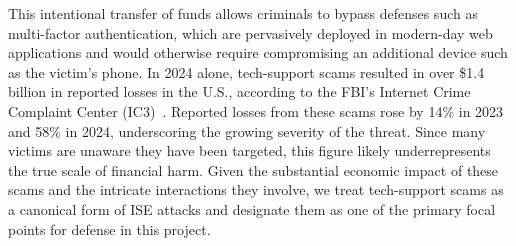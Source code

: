 This intentional transfer of funds allows criminals to bypass defenses such as multi-factor authentication, which are pervasively deployed in modern-day web applications and would otherwise require compromising an additional device such as the victim's phone. In 2024 alone, tech-support scams resulted in over \$1.4 billion in reported losses in the U.S., according to the FBI's Internet Crime Complaint Center (IC3)~\cite{ic3_report_24}. Reported losses from these scams rose by 14\% in 2023 and 58\% in 2024, underscoring the growing severity of the threat. Since many victims are unaware they have been targeted, this figure likely underrepresents the true scale of financial harm. Given the substantial economic impact of these scams and the intricate interactions they involve, we treat tech-support scams as a canonical form of ISE attacks and designate them as one of the primary focal points for defense in this project.




